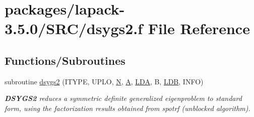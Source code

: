 \hypertarget{dsygs2_8f}{}\section{packages/lapack-\/3.5.0/\+S\+R\+C/dsygs2.f File Reference}
\label{dsygs2_8f}
\subsection*{Functions/\+Subroutines}
\begin{DoxyCompactItemize}
\item 
subroutine \hyperlink{group__doubleSYcomputational_ga4ac61c8e385266015e852e25c060cdb0}{dsygs2} (I\+T\+Y\+P\+E, U\+P\+L\+O, \hyperlink{polmisc_8c_a0240ac851181b84ac374872dc5434ee4}{N}, \hyperlink{classA}{A}, \hyperlink{example__user_8c_ae946da542ce0db94dced19b2ecefd1aa}{L\+D\+A}, B, \hyperlink{example__user_8c_a50e90a7104df172b5a89a06c47fcca04}{L\+D\+B}, I\+N\+F\+O)
\begin{DoxyCompactList}\small\item\em {\bfseries D\+S\+Y\+G\+S2} reduces a symmetric definite generalized eigenproblem to standard form, using the factorization results obtained from spotrf (unblocked algorithm). \end{DoxyCompactList}\end{DoxyCompactItemize}
